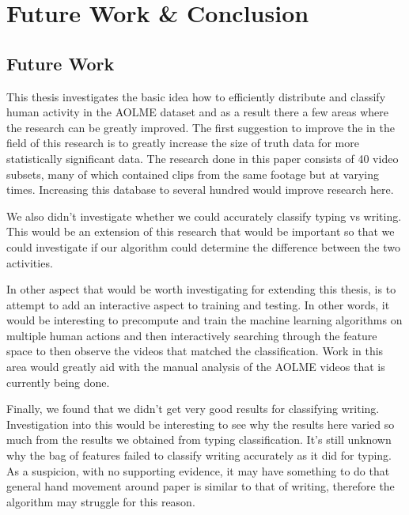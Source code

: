 \chapter{Future Work \& Conclusion}
\section{Future Work}
This thesis investigates the basic idea how to efficiently distribute and classify
human activity in the AOLME dataset and as a result there a few areas where the
research can be greatly improved. The first suggestion to improve the in the field
of this research is to greatly increase the size of truth data for more
statistically significant data. The research done in this paper consists of 40 video
subsets, many of which contained clips from the same footage but at varying times.
Increasing this database to several hundred would improve research here.

We also didn't investigate whether we could accurately classify typing vs writing.
This would be an extension of this research that would be important so that we
could investigate if our algorithm could determine the difference between the two
activities.

In other aspect that would be worth investigating for extending this thesis,
is to attempt to add an interactive aspect to training and testing. In other words,
it would be interesting to precompute and train the machine learning algorithms
on multiple human actions and then interactively searching through the feature
space to then observe the videos that matched the classification. Work in this
area would greatly aid with the manual analysis of the AOLME videos that is
currently being done.

Finally, we found that we didn't get very good results for classifying writing.
Investigation into this would be interesting to see why the results here varied
so much from the results we obtained from typing classification. It's still unknown
why the bag of features failed to classify writing accurately as it did for typing.
As a suspicion, with no supporting evidence, it may have something to do that
general hand movement around paper is similar to that of writing, therefore the
algorithm may struggle for this reason.

